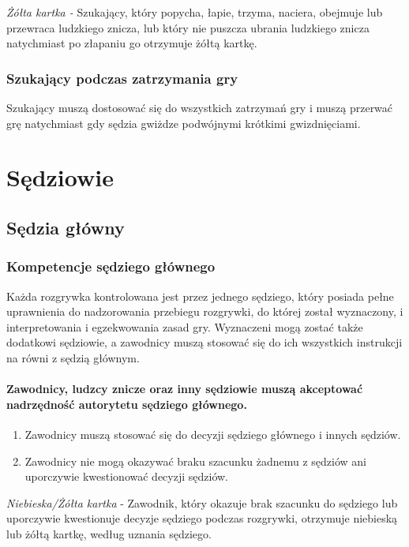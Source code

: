 \documentclass[12pt]{article}
\begin{document}
\emph{Żółta kartka -} Szukający, który popycha, łapie, trzyma, naciera,
obejmuje lub przewraca ludzkiego znicza, lub który nie puszcza ubrania
ludzkiego znicza natychmiast po złapaniu go otrzymuje żółtą kartkę.

\subsubsection{Szukający podczas zatrzymania gry}

Szukający muszą dostosować się do wszystkich zatrzymań gry i muszą
przerwać grę natychmiast gdy sędzia gwiżdze podwójnymi krótkimi
gwizdnięciami.

\pagebreak
\section{Sędziowie}

\subsection{Sędzia główny}

\subsubsection{Kompetencje sędziego głównego}

Każda rozgrywka kontrolowana jest przez jednego sędziego, który posiada
pełne uprawnienia do nadzorowania przebiegu rozgrywki, do której został
wyznaczony, i interpretowania i egzekwowania zasad gry. Wyznaczeni mogą
zostać także dodatkowi sędziowie, a zawodnicy muszą stosować się do ich
wszystkich instrukcji na równi z sędzią głównym.

\paragraph{Zawodnicy, ludzcy znicze oraz inny sędziowie muszą
	akceptować nadrzędność autorytetu sędziego głównego.}

\begin{enumerate}
	\item
	      Zawodnicy muszą stosować się do decyzji sędziego głównego i innych
	      sędziów.
	\item
	      Zawodnicy nie mogą okazywać braku szacunku żadnemu z sędziów ani
	      uporczywie kwestionować decyzji sędziów.
\end{enumerate}

\emph{Niebieska/Żółta kartka} - Zawodnik, który okazuje brak szacunku do
sędziego lub uporczywie kwestionuje decyzje sędziego podczas rozgrywki,
otrzymuje niebieską lub żółtą kartkę, według uznania sędziego.
\end{document}
